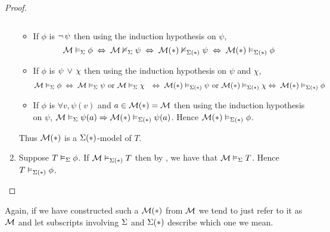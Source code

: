\begin{proof}
\begin{enumerate}
\begin{itemize}
\[                \]
            \item If $\phi$ is $\neg\, \psi$ 
                then using the induction hypothesis on $\psi$,
                \[
                    \mathcal{M} \vDash_{\Sigma} \phi \; \Leftrightarrow \;
                    \mathcal{M} \nvDash_{\Sigma} \psi \; \Leftrightarrow \;
                    \mathcal{M}(*) \nvDash_{\Sigma(*)} \psi \; \Leftrightarrow \;
                    \mathcal{M}(*) \vDash_{\Sigma(*)} \phi
                \]
            \item If $\phi$ is $\psi \, \lor \, \chi$
                then using the induction hypothesis on $\psi$ and $\chi$,
                \begin{align*}
                    \mathcal{M} \vDash_{\Sigma} \phi \; 
                    &\Leftrightarrow \; \mathcal{M} \vDash_{\Sigma} \psi \text{ or } 
                        \mathcal{M} \vDash_{\Sigma} \chi 
                    &\Leftrightarrow \; \mathcal{M}(*) \vDash_{\Sigma(*)} \psi \text{ or } 
                    \mathcal{M}(*) \vDash_{\Sigma(*)} \chi 
                    &\Leftrightarrow \; \mathcal{M}(*) \vDash_{\Sigma(*)} \phi
                \end{align*}
            \item If $\phi$ is $\forall v, \psi(v)$ and 
                $a \in {\mathcal{M}(*)} = {\mathcal{M}}$
                then using the induction hypothesis on $\psi$,
                $\mathcal{M} \vDash_{\Sigma} \psi(a) \Rightarrow \mathcal{M}(*) \vDash_{\Sigma(*)} \psi(a)$.
                Hence $\mathcal{M}(*) \vDash_{\Sigma(*)} \phi$.
        \end{itemize}
        Thus $\mathcal{M}(*)$ is a $\Sigma(*)$-model of $T$.

        \item Suppose $T \vDash_{\Sigma} \phi$.
        If $\mathcal{M} \vDash_{\Sigma(*)} T$ then by 
        ,
        we have that $\mathcal{M} \vDash_{\Sigma} T$.
        Hence $T \vDash_{\Sigma(*)} \phi$.
    \end{enumerate}
\end{proof}
Again, if we have constructed such a $\mathcal{M}(*)$ from $\mathcal{M}$
we tend to just refer to it as $\mathcal{M}$ and let subscripts involving 
$\Sigma$ and $\Sigma(*)$ describe which one we mean.

